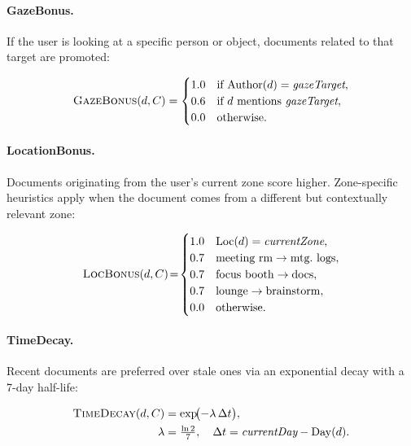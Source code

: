 \documentclass[journal]{IEEEtran}
\begin{document}
\paragraph{GazeBonus.}
If the user is looking at a specific person or object, documents
related to that target are promoted:

\begin{equation}
  \textsc{GazeBonus}(d,C) =
  \begin{cases}
    1.0 & \text{if } \mathrm{Author}(d) = \textit{gazeTarget}, \\
    0.6 & \text{if } d \text{ mentions } \textit{gazeTarget}, \\
    0.0 & \text{otherwise}.
  \end{cases}
  \label{eq:gazebonus}
\end{equation}

\paragraph{LocationBonus.}
Documents originating from the user's current zone score higher.
Zone-specific heuristics apply when the document comes from a
different but contextually relevant zone:

\begin{equation}
  \textsc{LocBonus}(d,C) \!=\!
  \begin{cases}
    1.0 & \mathrm{Loc}(d) = \textit{currentZone}, \\
    0.7 & \text{meeting rm} \to \text{mtg.\ logs}, \\
    0.7 & \text{focus booth} \to \text{docs}, \\
    0.7 & \text{lounge} \to \text{brainstorm}, \\
    0.0 & \text{otherwise}.
  \end{cases}
  \label{eq:locbonus}
\end{equation}

\paragraph{TimeDecay.}
Recent documents are preferred over stale ones via an exponential
decay with a 7-day half-life:

\begin{align}
  \textsc{TimeDecay}(d,C) &= \exp\!\bigl(-\lambda\,\Delta t\bigr),
  \notag \\
  \lambda &= \tfrac{\ln 2}{7},\quad
  \Delta t = \textit{currentDay} - \mathrm{Day}(d).
  \label{eq:timedecay}
\end{align}
\end{document}
